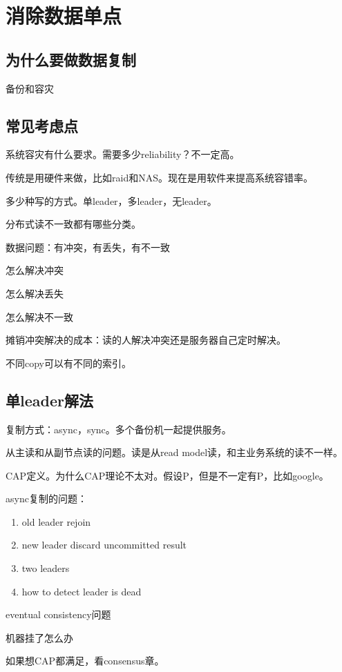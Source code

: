 \chapter{消除数据单点}

\section{为什么要做数据复制}
备份和容灾

\section{常见考虑点}

系统容灾有什么要求。需要多少reliability？不一定高。

传统是用硬件来做，比如raid和NAS。现在是用软件来提高系统容错率。

多少种写的方式。单leader，多leader，无leader。

分布式读不一致都有哪些分类。

数据问题：有冲突，有丢失，有不一致

怎么解决冲突

怎么解决丢失

怎么解决不一致

摊销冲突解决的成本：读的人解决冲突还是服务器自己定时解决。

不同copy可以有不同的索引。

\section{单leader解法}
复制方式：async，sync。多个备份机一起提供服务。

从主读和从副节点读的问题。读是从read model读，和主业务系统的读不一样。

CAP定义。为什么CAP理论不太对。假设P，但是不一定有P，比如google。


async复制的问题：
\begin{enumerate}
    \item old leader rejoin
    \item new leader discard uncommitted result
    \item two leaders
    \item how to detect leader is dead
\end{enumerate}


eventual consistency问题

机器挂了怎么办

如果想CAP都满足，看consensus章。


